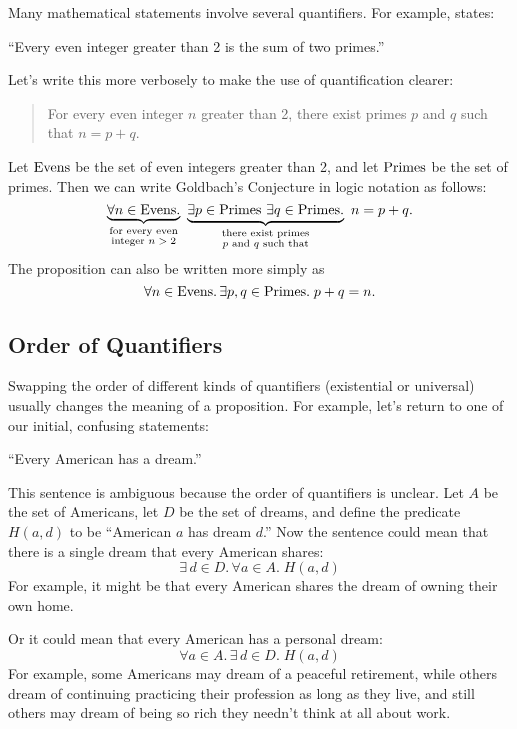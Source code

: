 Many mathematical statements involve several quantifiers.  For
example,  states:
%
\begin{center}
``Every even integer greater than 2 is the sum of two primes.''
\end{center}
%
Let's write this more verbosely to make the use of quantification
clearer:
%
\begin{quote}
For every even integer $n$ greater than 2,
there exist primes $p$ and $q$ such that $n = p + q$.
\end{quote}
%
Let $\text{Evens}$ be the set of even integers greater than 2, and let $\text{Primes}$ be the
set of primes.  Then we can write Goldbach's Conjecture in logic
notation as follows:
%
\[
\underbrace{\forall n \in \text{Evens}.}_{\substack
    {\text{for every even} \\
     \text{integer $n > 2$}}}
\
\underbrace{\exists p \in \text{Primes}\ \exists q \in \text{Primes}.}_{\substack
    {\text{there exist primes} \\
     \text{$p$ and $q$ such that}}}
\ n = p + q.
\]
The proposition can also be written more simply as
\[
 \forall n \in \text{Evens}.\, \exists p, q \in \text{Primes}. \; p + q = n.
\]

\subsection{Order of Quantifiers}

Swapping the order of different kinds of quantifiers (existential or
universal) usually changes the meaning of a proposition.  For example,
let's return to one of our initial, confusing statements:
\begin{center}
``Every American has a dream.''
\end{center}

This sentence is ambiguous because the order of quantifiers is
unclear.  Let $A$ be the set of Americans, let $D$ be the set of
dreams, and define the predicate $H(a, d)$ to be ``American $a$ has
dream $d$.''  Now the sentence could mean that there is a single dream
that every American shares:
\[
\exists\, d \in D.\, \forall a \in A.\; H(a, d)
\]
For example, it might be that every American shares the dream of owning
their own home.

Or it could mean that every American has a personal dream:
\[
\forall a \in A.\, \exists\, d \in D.\; H(a, d)
\]
For example, some Americans may dream of a peaceful retirement, while
others dream of continuing practicing their profession as long as they
live, and still others may dream of being so rich they needn't think at
all about work.

